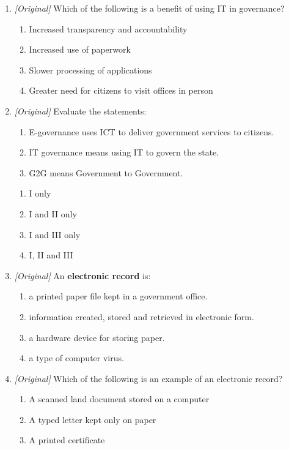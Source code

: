 \documentclass[11pt]{article}
\begin{document}
\begin{enumerate}[label=\textbf{Q\arabic*.}, leftmargin=*]
\begin{enumerate}[label=\Alph*.]
  \end{enumerate}
\item \textit{[Original]} Which of the following is a benefit of using IT in
  governance?
  \begin{enumerate}[label=\Alph*.]
    \item Increased transparency and accountability
    \item Increased use of paperwork
    \item Slower processing of applications
    \item Greater need for citizens to visit offices in person
  \end{enumerate}
\item \textit{[Original]} Evaluate the statements:
  \begin{enumerate}[label=\Roman*.]
    \item E-governance uses ICT to deliver government services to citizens.
    \item IT governance means using IT to govern the state.
    \item G2G means Government to Government.
  \end{enumerate}
  \begin{enumerate}[label=\Alph*.]
    \item I only
    \item I and II only
    \item I and III only
    \item I, II and III
  \end{enumerate}
\item \textit{[Original]} An \textbf{electronic record} is:
  \begin{enumerate}[label=\Alph*.]
    \item a printed paper file kept in a government office.
    \item information created, stored and retrieved in electronic form.
    \item a hardware device for storing paper.
    \item a type of computer virus.
  \end{enumerate}
\item \textit{[Original]} Which of the following is an example of an
  electronic record?
  \begin{enumerate}[label=\Alph*.]
    \item A scanned land document stored on a computer
    \item A typed letter kept only on paper
    \item A printed certificate

\end{enumerate}
\end{enumerate}
\end{document}
